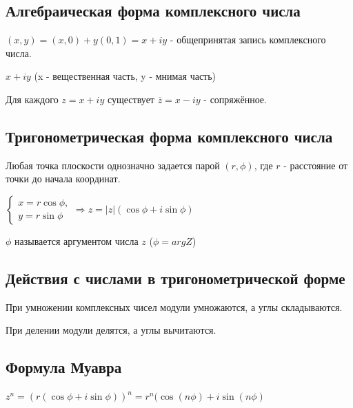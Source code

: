 \documentclass[a4paper]{article}
\begin{document}
    \subsection*{Алгебраическая форма комплексного числа}
    $(x,y) = (x,0) + y(0,1) = x+iy$ - общепринятая запись комплексного числа.

    $x+iy$ (x - вещественная часть, y - мнимая часть)

    Для каждого $z = x+iy$ существует $\overline{z} = x-iy$ - сопряжённое.

    \newpage \begin{center}
                 \begin{Large}
                 \end{Large}
    \end{center}
    \subsection*{Тригонометрическая форма комплексного числа}

    Любая точка плоскости однозначно задается парой $(r, \phi)$, где $r$ - расстояние от точки до начала координат.

    $\displaystyle \begin{cases}
                       x = r \cos \phi,
                       \\
                       y = r \sin \phi
    \end{cases} \Rightarrow z = |z| (\cos \phi + i \sin \phi)$

    $\phi$ называется аргументом числа $z$ ($\phi = argZ$)

    \subsection*{Действия с числами в тригонометрической форме}

    При умножении комплексных чисел модули умножаются, а углы складываются.

    При делении модули делятся, а углы вычитаются.



    \subsection*{Формула Муавра}
    $z^n = (r(\cos \phi + i \sin \phi))^n = r^n ( \cos(n \phi) + i \sin(n \phi)$

    \newpage \begin{center}
                 \begin{Large}
                 \end{Large}
    \end{center}
\end{document}
